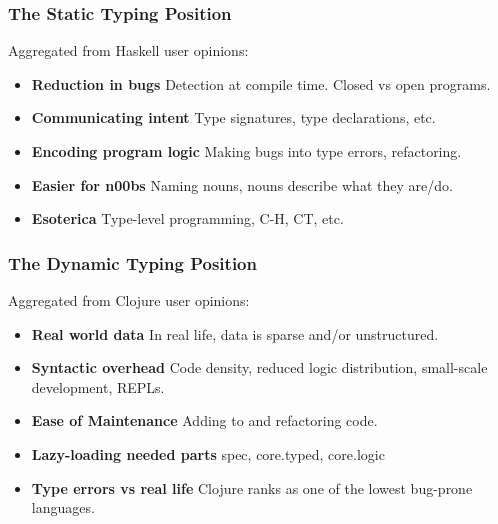 \documentclass{beamer}
\begin{document}

\begin{frame}
  \frametitle{The Static Typing Position}
  Aggregated from Haskell user opinions:
  \begin{itemize}
  \item \textbf{Reduction in bugs} Detection at compile time.  Closed vs open programs.
  \item \textbf{Communicating intent} Type signatures, type declarations, etc.
  \item \textbf{Encoding program logic} Making bugs into type errors, refactoring.
  \item \textbf{Easier for n00bs} Naming nouns, nouns describe what they are/do.
  \item \textbf{Esoterica} Type-level programming, C-H, CT, etc.
  \end{itemize}
\end{frame}

\begin{frame}
  \frametitle{The Dynamic Typing Position}
  Aggregated from Clojure user opinions:
  \begin{itemize}
  \item \textbf{Real world data} In real life, data is sparse and/or unstructured.
  \item \textbf{Syntactic overhead} Code density, reduced logic distribution,
    small-scale development, REPLs.
  \item \textbf{Ease of Maintenance} Adding to and refactoring code.
  \item \textbf{Lazy-loading needed parts} spec, core.typed, core.logic
  \item \textbf{Type errors vs real life} Clojure ranks as one of the lowest bug-prone
    languages.
  \end{itemize}
\end{frame}
\end{document}
